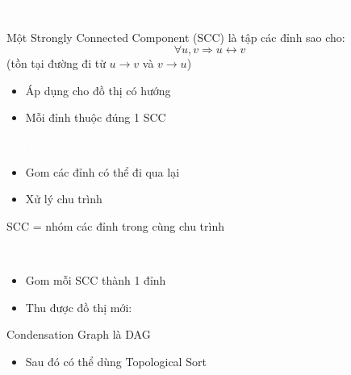 \documentclass{beamer}
\title{\hlred{Strongly Connected Components}}
\author{Group 3}
\date{\hlcyan{03/2026}}
\newcommand{\hlblue}[1]{\textcolor{myblue}{#1}}
\newcommand{\hlgreen}[1]{\textcolor{mygreen}{#1}}
\newcommand{\hlred}[1]{\textcolor{myred}{#1}}
\newcommand{\hlpurple}[1]{\textcolor{mypurple}{#1}}
\newcommand{\hlwhite}[1]{\textcolor{white}{#1}}
\begin{document}
\frame{\titlepage}


\begin{frame}{\hlwhite{Định nghĩa}}
\begin{tcolorbox}[title=\textbf{\hlwhite{Khái niệm}}]
Một \hlblue{Strongly Connected Component (SCC)} là tập các đỉnh sao cho:
\[
\forall u, v \Rightarrow u \leftrightarrow v
\]
(tồn tại đường đi từ $u \rightarrow v$ và $v \rightarrow u$)
\end{tcolorbox}

\begin{itemize}
\item Áp dụng cho \hlred{đồ thị có hướng}
\item Mỗi đỉnh thuộc đúng \hlgreen{1 SCC}
\end{itemize}
\end{frame}


\begin{frame}{\hlwhite{Bản chất}}
\begin{itemize}
\item Gom các đỉnh có thể đi qua lại
\item Xử lý \hlblue{chu trình}
\end{itemize}

\begin{tcolorbox}
\centering
\hlpurple{SCC = nhóm các đỉnh trong cùng chu trình}
\end{tcolorbox}
\end{frame}


\begin{frame}{\hlwhite{Tính chất}}
\begin{itemize}
\item Gom mỗi SCC thành 1 đỉnh
\item Thu được đồ thị mới:
\end{itemize}

\begin{tcolorbox}
\centering
\hlred{Condensation Graph là DAG}
\end{tcolorbox}

\begin{itemize}
\item Sau đó có thể dùng \hlblue{Topological Sort}
\end{itemize}
\end{frame}
\end{document}
